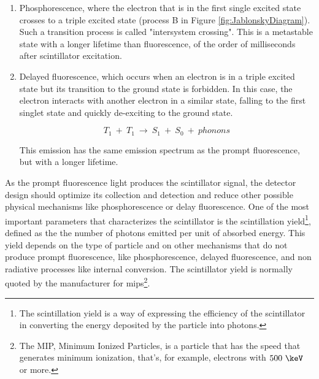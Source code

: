 \begin{enumerate}
\item{} Phosphorescence, where the electron that is in the first single excited state crosses to a triple excited state (process B in Figure \ref{fig:JablonskyDiagram}). Such a transition process is called "intersystem crossing". This is a metastable state with a longer lifetime than fluorescence, of the order of milliseconds after scintillator excitation.

\item{} Delayed fluorescence, which occurs when an electron is in a triple excited state but its transition to the ground state is forbidden. In this case, the electron interacts with another electron in a similar state, falling to the first singlet state and quickly de-exciting to the ground state. 

\begin{equation}
T_{1} ~+~ T_{1}~ \longrightarrow ~ S_{1} ~+~ S_{0} ~+~ phonons
\label{eq:DelayFluorescence}
\end{equation}

This emission has the same emission spectrum as the prompt fluorescence, but with a longer lifetime.
\end{enumerate}
As the prompt fluorescence light produces the scintillator signal, the detector design should optimize its collection and detection and reduce other possible physical mechanisms like phosphorescence or delay fluorescence. One of the most important parameters that characterizes the scintillator is the scintillation yield\footnote{The scintillation yield is a way of expressing the efficiency of the scintillator in converting the energy deposited by the particle into photons.}, defined as the the number of photons emitted per unit of absorbed energy. This yield depends on the type of particle and on other mechanisms that do not produce prompt fluorescence, like phosphorescence, delayed fluorescence, and non radiative processes like internal conversion. The scintillator yield is normally quoted by the manufacturer for mips\footnote{The MIP, Minimum Ionized Particles, is a particle that has the speed that generates minimum ionization, that's, for example, electrons with $500~\keV$ or more.}.
